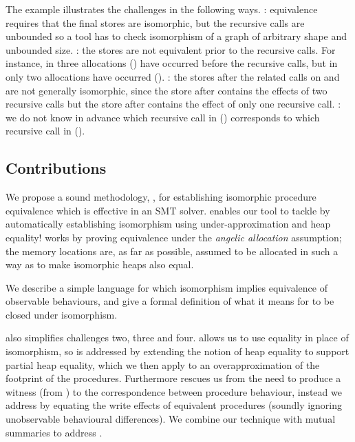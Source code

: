 \documentclass[runningheads,a4paper]{llncs}
\begin{document}
The example illustrates the challenges in the following ways. \textbf{\Cone{}}: equivalence requires that the final stores are isomorphic, but the recursive calls are unbounded so a tool has to check isomorphism of a graph of arbitrary shape and unbounded size. \textbf{\Ctwo{}}: the stores are not equivalent prior to the recursive calls. For instance, in \copylr{} three allocations () have occurred before the recursive calls, but in \copyrl{} only two allocations have occurred (). \textbf{\Cthree{}}: the stores after the related calls on  and  are not generally isomorphic, since the store after  contains the effects of two recursive calls but the store after  contains the effect of only one recursive call. \textbf{\Cfour{}}: we do not know in advance which recursive call in \copylr{} () corresponds to which recursive call in \copyrl{} ().

\subsection{Contributions}

We propose a sound methodology, \metho{}, for establishing isomorphic procedure equivalence which is effective in an SMT solver. \metho{} enables our tool \tool{} to tackle \textbf{\cone{}} by automatically establishing isomorphism using under-approximation and heap equality! \metho{} works by proving equivalence under the \emph{angelic allocation} assumption; the memory locations are, as far as possible, assumed to be allocated in such a way as to make isomorphic heaps also equal.

We describe a simple language \lang{} for which isomorphism implies equivalence of observable behaviours, and give a formal definition of what it means for \lang{} to be closed under isomorphism.

\metho{} also simplifies challenges two, three and four. \metho{} allows us to use equality in place of isomorphism, so \textbf{\ctwo{}} is addressed by extending the notion of heap equality to support partial heap equality, which we then apply to an overapproximation of the footprint of the procedures. Furthermore \metho{} rescues us from the need to produce a witness (from \textbf{\cone{}}) to the correspondence between procedure behaviour, instead we address \textbf{\cthree{}} by equating the write effects of equivalent procedures (soundly ignoring unobservable behavioural differences). We combine our technique with mutual summaries to address \textbf{\cfour{}}.
\end{document}
